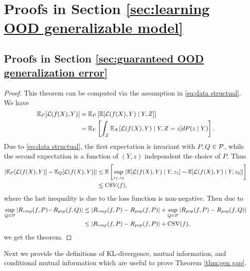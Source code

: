 \section{Proofs in Section \ref{sec:learning OOD generalizable model}}
\subsection{Proofs in Section \ref{sec:guaranteed OOD generalization error}}\label{app:proofs in sec guaranteed}
\boundedgap*
\begin{proof}
	This theorem can be computed via the assumption in \eqref{eq:data structual}. We have 
	\begin{equation}
		\small
		\begin{aligned}
			\mE_{P}[\cL(f(X), Y)] & = \mE_{P}\left[\mE[\cL(f(X), Y)\mid Y, Z]\right] \\
			& = \mE_{Y}\left[\int_{\cZ} \mE_{X}[\cL(f(X), Y)\mid Y, Z = z]dP(z\mid Y)\right].
		\end{aligned}
	\end{equation}
	Due to \eqref{eq:data structual}, the first expectation is invariant with $P, Q\in \mathcal{P}$, while the second expectation is a function of $(Y, z)$ independent the choice of $P$. Thus
	\begin{equation}
		\small
		\begin{aligned}
			\left|\mE_{P}[\cL(f(X), Y)] - \mE_{Q}[\cL(f(X), Y)]\right|  & \leq \mE\left[\sup_{z_{1}, z_{2}}\left|\mE[\cL(f(X),Y)\mid Y,  z_{1}] - \mE[\cL(f(X), Y)\mid Y, z_{2}]\right|\right] \\
			& \leq \mathrm{CSV}(f),
		\end{aligned}
	\end{equation}
	where the last inequality is due to the loss function is non-negative. Then due to 
	\begin{equation}
		\small
		\begin{aligned}
			\sup_{Q\in\cP}\left|R_{emp}(f, P) - \!\!\right.\left. R_{pop}(f, Q)\right|  &\leq \left|R_{emp}(f, P) - R_{pop}(f, P)\right| + \sup_{Q\in\cP}\left|R_{pop}(f, P) - R_{pop}(f, Q)\right| \\
			& \leq  \left|R_{emp}(f, P) - R_{pop}(f, P)\right| + \mathrm{CSV}(f),
		\end{aligned}
	\end{equation}
	we get the theorem. 
\end{proof}
\par
Next we provide the definitions of KL-divergence, mutual information, and conditional mutual information which are useful to prove Theorem \ref{thm:gen gap}. 
